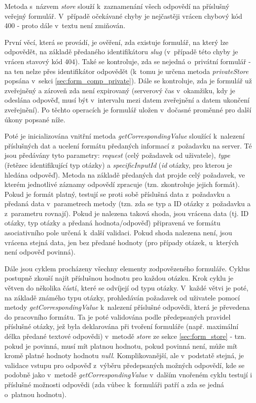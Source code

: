 			\label{sec:form_comp_public}
			Metoda s~názvem \textit{store} slouží k~zaznamenání všech odpovědí na příslušný veřejný formulář. V~případě očekávané chyby je nejčastěji vrácen chybový kód 400 - proto dále v~textu není zmiňován.
			
			První věcí, která se provádí, je ověření, zda existuje formulář, na který lze odpovědět, na základě předaného identifikátoru \textit{slug} (v~případě této chyby je vrácen stavový kód 404). Také se kontroluje, zda se nejedná o~privátní formulář - na ten nelze přes identifikátor odpovědět (k~tomu je určena metoda \textit{privateStore} popsána v~sekci \ref{sec:form_comp_private}). Dále se kontroluje, zda je formulář už zveřejněný a zároveň zda není expirovaný (serverový čas v~okamžiku, kdy je odeslána odpověď, musí být v~intervalu mezi datem zveřejnění a datem ukončení zveřejnění). Po těchto operacích je formulář uložen v~dočasné proměnné pro další úkony popsané níže.
			
			Poté je inicializována vnitřní metoda \textit{getCorrespondingValue} sloužící k~nalezení příslušných dat a ucelení formátu předaných informací z~požadavku na server. Té jsou předávány tyto parametry: \textit{request} (celý požadavek od uživatele), \textit{type} (řetězec identifikující typ otázky) a \textit{specificInputId} (\textit{id} otázky, pro kterou je hledána odpověď). Metoda na základě předaných dat projde celý požadavek, ve kterém jednotlivé záznamy odpovědí zpracuje (tzn. zkontroluje jejich formát). Pokud je formát platný, testují se proti sobě příslušná data z~požadavku a předaná data v~parametrech metody (tzn. zda se typ a ID otázky z~požadavku a z~parametru rovnají). Pokud je nalezena taková shoda, jsou vrácena data (tj. ID otázky, typ otázky a předaná hodnota/odpověď) připravená ve formátu asociativního pole určená k~další validaci. Pokud shoda nalezena není, jsou vrácena stejná data, jen bez předané hodnoty (pro případy otázek, u~kterých není odpověď povinná).
			
			Dále jsou cyklem procházeny všechny elementy zodpovězeného formuláře. Cyklus postupně zkouší najít příslušnou hodnotu pro každou otázku. Krok cyklu je větven do několika částí, které se odvíjejí od typu otázky. V~každé větvi je poté, na základě známého typu otázky, prohledáván požadavek od uživatele pomocí metody \textit{getCorrespondingValue} k~nalezení příslušné odpovědi, která je převedena do pracovního formátu. Ta je poté validována podle předepsaných pravidel příslušné otázky, jež byla deklarována při tvoření formuláře (např. maximální délka předané textové odpovědi) v~metodě \textit{store} ze sekce \ref{sec:form_store} - tzn. pokud je povinná, musí mít platnou hodnotu, pokud povinná není, může mít kromě platné hodnoty hodnotu \textit{null}. Komplikovanější, ale v~podstatě stejná, je validace vstupu pro odpověď z~výběru předepsaných možných odpovědí, kde se podobně jako v~metodě \textit{getCorrespondingValue} v~dalším vnořeném cyklu testují i příslušné možnosti odpovědi (zda vůbec k~formuláři patří a zda se jedná o~platnou hodnotu).
			
